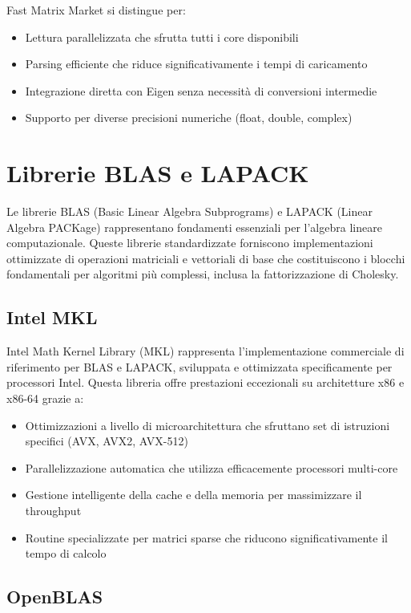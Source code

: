 Fast Matrix Market si distingue per:
\begin{itemize}
    \item Lettura parallelizzata che sfrutta tutti i core disponibili
    \item Parsing efficiente che riduce significativamente i tempi di caricamento
    \item Integrazione diretta con Eigen senza necessità di conversioni intermedie
    \item Supporto per diverse precisioni numeriche (float, double, complex)
\end{itemize}

\section{Librerie BLAS e LAPACK}

Le librerie BLAS (Basic Linear Algebra Subprograms) e LAPACK (Linear Algebra PACKage) rappresentano fondamenti essenziali per l'algebra 
lineare computazionale. Queste librerie standardizzate forniscono implementazioni ottimizzate di operazioni matriciali e vettoriali 
di base che costituiscono i blocchi fondamentali per algoritmi più complessi, inclusa la fattorizzazione di Cholesky.

\subsection{Intel MKL}

Intel Math Kernel Library (MKL) rappresenta l'implementazione commerciale di riferimento per BLAS e LAPACK, sviluppata e ottimizzata 
specificamente per processori Intel. Questa libreria offre prestazioni eccezionali su architetture x86 e x86-64 grazie a:

\begin{itemize}
    \item Ottimizzazioni a livello di microarchitettura che sfruttano set di istruzioni specifici (AVX, AVX2, AVX-512)
    \item Parallelizzazione automatica che utilizza efficacemente processori multi-core
    \item Gestione intelligente della cache e della memoria per massimizzare il throughput
    \item Routine specializzate per matrici sparse che riducono significativamente il tempo di calcolo
\end{itemize}

\subsection{OpenBLAS}

